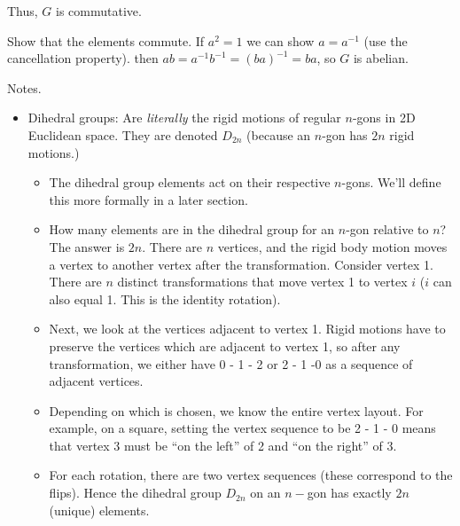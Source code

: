 \documentclass[1    0pt, answers]{exam} \renewcommand{\baselinestretch}{1.05}
\theoremstyle{plain}
\theoremstyle{definition}
\begin{document}
\begin{questions}
\begin{solution}
Thus, $G$ is commutative.
\end{solution}

\begin{solution}
Show that the elements commute.
If $a^2 = 1$ we can show $a = a^{-1}$ (use the cancellation property).
then $ab = a^{-1}b^{-1} = (ba)^{-1} = ba$, so $G$ is abelian. 
\end{solution}

Notes.
\begin{itemize}
    \item Dihedral groups: Are \emph{literally} the rigid motions of regular $n$-gons in 2D Euclidean space. They are denoted $D_{2n}$ (because an $n$-gon has $2n$ rigid motions.)
    \begin{itemize}
    \item The dihedral group elements act on their respective $n$-gons. We'll define this more formally in a later section.
    \item How many elements are in the dihedral group for an $n$-gon relative to $n$? The answer is $2n$. There are $n$ vertices, and the rigid body motion moves a vertex to another vertex after the transformation. Consider vertex 1. There are $n$ distinct  transformations that move vertex 1 to vertex $i$ ($i$ can also equal 1. This is the identity rotation).
    \item Next, we look at the vertices adjacent to vertex 1. Rigid motions have to preserve the vertices which are adjacent to vertex 1, so after any transformation, we either have 0 - 1 - 2 or 2 - 1 -0 as a sequence of adjacent vertices.
    \item Depending on which is chosen, we know the entire vertex layout. For example, on a square, setting the vertex sequence to be 2 - 1 - 0 means that vertex 3 must be ``on the left'' of 2 and ``on the right'' of 3.
    \item For each rotation, there are two vertex sequences (these correspond to the flips). Hence the dihedral group $D_{2n}$ on an $n-$gon has exactly $2n$ (unique) elements.
    \end{itemize}
    

\end{itemize}
\end{questions}
\end{document}
